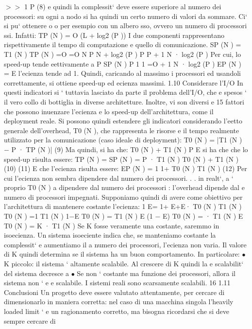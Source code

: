 \documentclass[a4paper,12pt]{article}
\begin{document}
$>$$>$ 1
P
(8)
e quindi la complessit` deve essere superiore al numero dei processori: su ogni
a
nodo si ha quindi un certo numero di valori da sommare. Ci` si pu` ottenere
o
o
per esempio con un albero sso, ovvero un numero di processori ssi. Infatti:
TP (N ) = O (L + log2 (P ))
I due componenti rappresentano rispettivamente il tempo di computazione e
quello di comunicazione.
SP (N ) =
T1 (N )
TP (N )
=O
=O
N
P
N
+ log2 (P )
P
P
+
1
N · log2 (P )
Per cui, lo speed-up tende eettivamente a P
SP (N )
P
1
1
=O
+
1 N · log2 (P )
EP (N ) =
E l'ecienza tende ad 1. Quindi, caricando al massimo i processori ed usandoli
correttamente, si ottiene speed-up ed ecienza massimi.
1.10
Considerare l'I/O
In questi indicatori si ` tuttavia lasciato da parte il problema dell'I/O, che
e
spesos ` il vero collo di bottiglia in diverse architetture. Inoltre, vi son diversi
e
15
fattori che possono inuenzare l'ecienza e lo speed-up dell'architettura, come
il deployment reale. Si possono quindi estendere gli indicatori considerando
l'eetto generale dell'overhead, T0 (N ), che rappresenta le risorse e il tempo
realmente utilizzato per la comunicazione (caso ideale di deployment):
T0 (N ) = |T1 (N ) $-$ P · TP (N )|
(9)
Ma quindi, si ha che:
T0 (N ) + T1 (N )
P
E si ha che che lo speed-up risulta essere:
TP (N ) =
SP (N ) =
P · T1 (N )
T0 (N ) + T1 (N )
(10)
(11)
E che l'ecienza risulta essere:
EP (N ) =
1
1+
T0 (N )
T1 (N )
(12)
Per cui l'ecienza non sembra dipendere dal numero dei processori. . . in realt`,
a
` proprio T0 (N ) a dipendere dal numero dei processori : l'overhead dipende dal
e
numero di processori impegnati.
Supponiamo quindi di avere come obiettivo per l'architettura di mantenere
costante l'ecienza:
1
E=
1+
E+E·
T0 (N )
T1 (N )
T0 (N )
=1
T1 (N )
1$-$E
T0 (N )
=
T1 (N )
E
(1 $-$ E)
T0 (N ) =
· T1 (N )
E
T0 (N ) = K · T1 (N )
Se K fosse veramente una costante, saremmo in isoecienza. Un sistema isoeciente indica che, se manteniamo costante la
complessit` e aumentiamo il
a
numero dei processori, l'ecienza non varia. Il valore di K quindi determina se
il sistema ha un buon comportamento. In particolare:
$\bullet$ K piccolo: il sistema ` altamente scalabile. Al crescere di K quindi la
e
scalabilit` del sistema decresce
a
$\bullet$ Se non ` costante ma funzione dei processori, allora il sistema non `
e
e
scalabile.
I sistemi reali sono scarsamente scalabili.
16
1.11
Conclusioni
Un progetto deve essere valutato attentamente, per cercare di dimensionarlo
in maniera corretta: nel caso di una macchina singola l'heavily loaded limit `
e
un ragionamento corretto, ma bisogna ricordarsi che si deve sempre cercare di
$$
\end{document}
